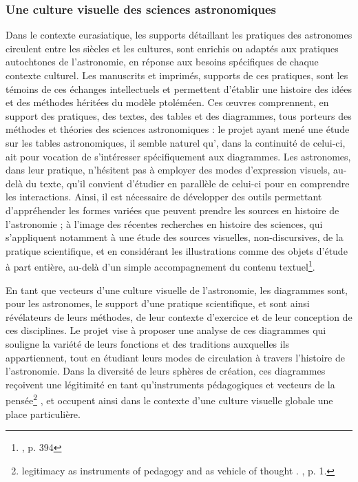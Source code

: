         \subsubsection{Une culture visuelle des sciences astronomiques}
Dans le contexte eurasiatique, les supports détaillant les pratiques des astronomes circulent entre les siècles et les cultures, sont enrichis ou adaptés aux pratiques autochtones de l'astronomie, en réponse aux besoins spécifiques de chaque contexte culturel. Les manuscrits et imprimés, supports de ces pratiques, sont les témoins de ces échanges intellectuels et permettent d'établir une histoire des idées et des méthodes héritées du modèle ptoléméen. Ces œuvres comprennent, en support des pratiques, des textes, des tables et des diagrammes, tous porteurs des méthodes et théories des sciences astronomiques : le projet \dishas ayant mené une étude sur les tables astronomiques, il semble naturel qu'\eida, dans la continuité de celui-ci, ait pour vocation de s'intéresser spécifiquement aux diagrammes. Les astronomes, dans leur pratique, n'hésitent pas à employer des modes d'expression visuels, au-delà du texte, qu'il convient d'étudier en parallèle de celui-ci pour en comprendre les interactions. Ainsi, il est nécessaire de développer des outils permettant d'appréhender les formes variées que peuvent prendre les sources en histoire de l'astronomie ; à l'image des récentes recherches en histoire des sciences, qui s'appliquent notamment à une étude des sources visuelles, non-discursives, de la pratique scientifique, et en considérant les illustrations comme des objets d'étude à part entière, au-delà d'un simple accompagnement du contenu textuel\footnote{\cite{jardineCriticalEditingEarlyModern2010}, p. 394}.

En tant que vecteurs d'une culture visuelle de l'astronomie, les diagrammes sont, pour les astronomes, le support d'une pratique scientifique, et sont ainsi révélateurs de leurs méthodes, de leur contexte d'exercice et de leur conception de ces disciplines. Le projet vise à proposer une analyse de ces diagrammes qui souligne la variété de leurs fonctions et des traditions auxquelles ils appartiennent, tout en étudiant leurs modes de circulation à travers l'histoire de l'astronomie. Dans la diversité de leurs sphères de création, ces diagrammes reçoivent \og une légitimité en tant qu'instruments pédagogiques et vecteurs de la pensée\footnote{\og [...] legitimacy as instruments of pedagogy and as vehicle of thought \fg. \cite{hamburgerDiagramParadigmCrossCultural2022}, p. 1.}  \fg, et occupent ainsi dans le contexte d'une culture visuelle globale une place particulière.

